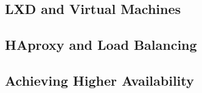 \subsection{LXD and Virtual Machines}


\subsection{HAproxy and Load Balancing}



\subsection{Achieving Higher Availability}